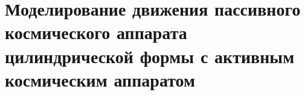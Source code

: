 \section{Моделирование движения пассивного космического аппарата цилиндрической формы с активным космическим аппаратом}
\label{SEC:2SPH_MSM}
